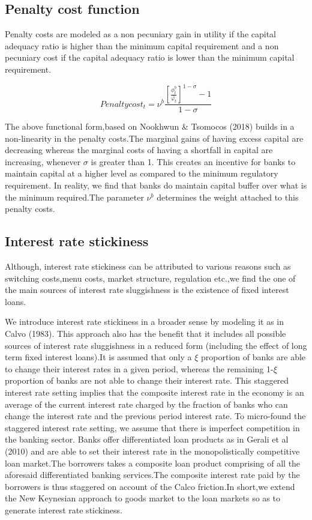 \documentclass[12pt]{article}
\numberwithin{equation}{section}
\begin{document}
\begin{appendix}
\subsection*{Penalty cost function}

Penalty costs are modeled as a non pecuniary gain in utility if the capital adequacy ratio is higher than the minimum capital requirement and a non pecuniary cost if the capital adequacy ratio is lower than the minimum capital requirement.

\begin{equation}
Penalty cost_t=\nu^b \frac{[\frac{\phi^b_t}{\bar{\varphi_t}}]^{1-\sigma}-1}{{1-\sigma}}
\end{equation}

The above functional form,based on Nookhwun \& Tsomocos (2018) builds in a non-linearity in the penalty costs.The marginal gains of having excess capital are decreasing whereas the marginal costs of having a shortfall in capital are increasing, whenever $\sigma$ is greater than 1. This creates an incentive for banks to maintain capital at a higher level as compared to the minimum regulatory requirement. In reality, we find that banks do maintain capital buffer over what is the minimum required.The parameter $\nu^b$ determines the weight attached to this penalty costs.

\subsection*{Interest rate stickiness}

Although, interest rate stickiness can be attributed to various reasons such as switching costs,menu costs, market structure, regulation etc.,we find the one of the main sources of interest rate sluggishness is the existence of fixed interest loans.

We introduce interest rate stickiness in a broader sense by modeling it as in Calvo (1983). This approach also has the benefit that it includes all possible sources of interest rate sluggishness in a reduced form (including the effect of long term fixed interest loans).It is assumed that only a $\xi$ proportion of banks are able to change their interest rates in a given period, whereas the remaining 1-$\xi$ proportion of banks are not able to change their interest rate. This staggered interest rate setting implies that the composite interest rate in the economy is an average of the current interest rate charged by the fraction of banks who can change the interest rate and the previous period interest rate.
To micro-found the staggered interest rate setting, we assume that there is imperfect competition in the banking sector. Banks offer differentiated loan products as in Gerali et al (2010) and are able to set their interest rate in the monopolistically competitive loan market.The borrowers takes a composite loan product comprising of all the aforesaid differentiated banking services.The composite interest rate paid by the borrowers is thus staggered on account of the Calco friction.In short,we extend the New Keynesian approach to goods market to the loan markets so as to generate interest rate stickiness. 


\end{appendix}
\end{document}
